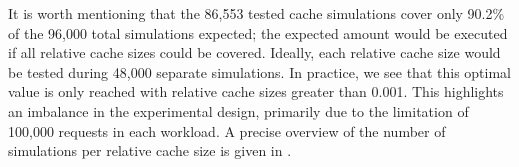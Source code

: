 It is worth mentioning that the 86,553 tested cache simulations cover only 90.2\% of the 96,000 total simulations expected; the expected amount would be executed if all relative cache sizes could be covered. Ideally, each relative cache size would be tested during 48,000 separate simulations. In practice, we see that this optimal value is only reached with relative cache sizes greater than 0.001. This highlights an imbalance in the experimental design, primarily due to the limitation of 100,000 requests in each workload. A precise overview of the number of simulations per relative cache size is given in .